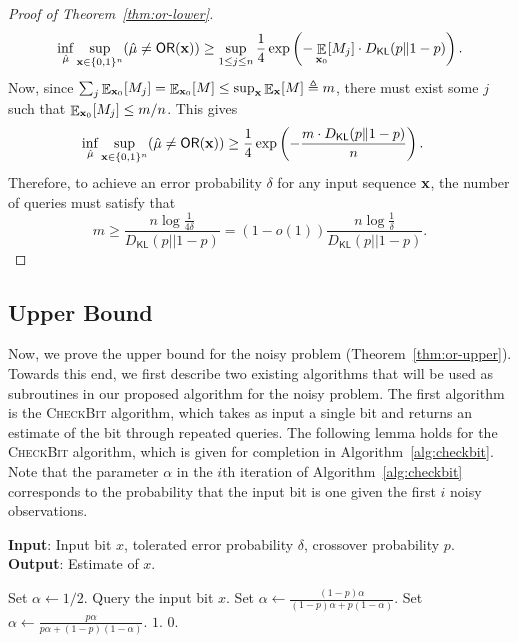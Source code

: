 \documentclass[journal, onecolumn]{IEEEtran}
\theoremstyle{plain}
\theoremstyle{definition}
\theoremstyle{remark}
\DeclareMathOperator\E{\mathbb{E}}
\let\P\relax
\DeclareMathOperator\P{\mathsf{P}}
\newcommand{\scb}{\textsc{CheckBit }}
\begin{document}
\begin{proof}[Proof of Theorem~\ref{thm:or-lower}]
\begin{align*}
     \inf_{\hat\mu} \sup_{{\bf x}\in\{0, 1\}^n} \P(\hat\mu \neq \mathsf{OR}({\bf x})) \geq \sup_{1\leq j\leq n} \frac{1}{4}\exp\left(-\E_{{\bf x}_0}[M_j] \cdot D_{\mathsf{KL}}(p\|1-p)\right).
\end{align*}
Now, since $\sum_j \E_{{\bf x}_0}[M_j] = \E_{{\bf x}_0}[M] \leq \sup_{\bf x}\E_{\bf x}[M] \triangleq m$, there must exist some $j$ such that $\E_{{\bf x}_0}[M_j]  \leq m/n$. This gives
\begin{align*}
      \inf_{\hat\mu} \sup_{{\bf x}\in\{0, 1\}^n} \P(\hat\mu \neq \mathsf{OR}({\bf x})) &  \geq  \frac{1}{4} \exp\left(-\frac{m\cdot D_{\mathsf{KL}}(p\|1-p)}{n}\right).
\end{align*}
Therefore, to achieve an error probability $\delta$ for any input sequence ${\bf x}$, the number of queries must satisfy that
\[
m\geq \frac{n\log \frac{1}{4\delta}}{D_\mathsf{KL}(p||1-p)}=(1-o(1))\frac{n\log \frac{1}{\delta}}{D_\mathsf{KL}(p||1-p)}.
\]
\end{proof}



\subsection{Upper Bound} \label{sec:or-upper}
Now, we prove the upper bound for the noisy \orn problem (Theorem~\ref{thm:or-upper}). Towards this end, we first describe two existing algorithms that will be used as subroutines in our proposed algorithm for the noisy \orn problem. The first algorithm is the \scb algorithm, which takes as input a single bit and returns an estimate of the bit through repeated queries. The following lemma holds for the \scb algorithm, which is given for completion in Algorithm~\ref{alg:checkbit}. Note that the parameter $\alpha$ in the $i$th iteration of Algorithm~\ref{alg:checkbit} corresponds to the probability that the input bit is one given the first $i$ noisy observations.

\begin{algorithm}[t]%
    \caption{\scb{} algorithm for finding the value of an input bit}
    \label{alg:checkbit}
    \textbf{Input}: Input bit $x$, tolerated error probability $\delta$, crossover probability $p$.\\
    \textbf{Output}: Estimate of $x$.
    \begin{algorithmic}[1]
        \State Set $\alpha\gets 1/2$.
            \State Query the input bit $x$.
                \State Set $\alpha \gets \frac{(1-p)\alpha}{(1-p)\alpha + p(1-\alpha)}$.
            \Else
                \State Set  $\alpha \gets \frac{p\alpha}{p\alpha + (1-p)(1-\alpha)}$. 
            \EndIf
        \EndWhile
            \State \Return $1$.
        \Else
            \State \Return $0$.
        \EndIf
    \end{algorithmic}
\end{algorithm}
\end{document}
